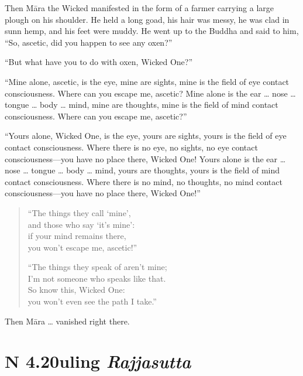 \documentclass[12pt,openany]{book}%
\newcommand*{\suttatitleacronym}[1]{\smaller[2]{#1}\vspace*{.3em}}
\newcommand*{\suttatitletranslation}[1]{\linebreak{#1}}
\newcommand*{\suttatitleroot}[1]{\linebreak\smaller[2]\itshape{#1}}
\newcommand*{\tocacronym}[1]{\hspace*{-3.3em}{#1}\quad}
\newcommand*{\toctranslation}[1]{#1}
\newcommand*{\tocroot}[1]{(\textit{#1})}
\begin{document}
Then \textsanskrit{Māra} the Wicked manifested in the form of a farmer carrying a large plough on his shoulder. He held a long goad, his hair was messy, he was clad in sunn hemp, and his feet were muddy. He went up to the Buddha and said to him, “So, ascetic, did you happen to see any oxen?” 

“But what have you to do with oxen, Wicked One?” 

“Mine alone, ascetic, is the eye, mine are sights, mine is the field of eye contact consciousness. Where can you escape me, ascetic? Mine alone is the ear … nose … tongue … body … mind, mine are thoughts, mine is the field of mind contact consciousness. Where can you escape me, ascetic?” 

“Yours alone, Wicked One, is the eye, yours are sights, yours is the field of eye contact consciousness. Where there is no eye, no sights, no eye contact consciousness—you have no place there, Wicked One! Yours alone is the ear … nose … tongue … body … mind, yours are thoughts, yours is the field of mind contact consciousness. Where there is no mind, no thoughts, no mind contact consciousness—you have no place there, Wicked One!” 

\begin{verse}%
“The things they call ‘mine’, \\
and those who say ‘it’s mine’: \\
if your mind remains there, \\
you won’t escape me, ascetic!” 

“The things they speak of aren’t mine; \\
I’m not someone who speaks like that. \\
So know this, Wicked One: \\
you won’t even see the path I take.” 

%
\end{verse}

Then \textsanskrit{Māra} … vanished right there. 

%
\section*{{\suttatitleacronym SN 4.20}{\suttatitletranslation Ruling }{\suttatitleroot Rajjasutta}}
\addcontentsline{toc}{section}{\tocacronym{SN 4.20} \toctranslation{Ruling } \tocroot{Rajjasutta}}
\end{document}
